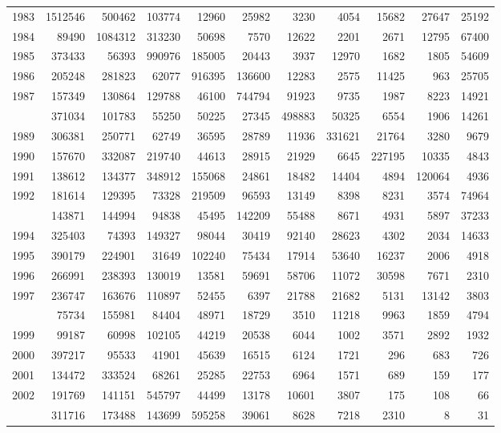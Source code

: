 \documentclass[
]{article}
\begin{document}
\begin{longtable}[t]{lrrrrrrrrrr}
1983 & 1512546 & 500462 & 103774 & 12960 & 25982 & 3230 & 4054 & 15682 & 27647 & 25192\\
1984 & 89490 & 1084312 & 313230 & 50698 & 7570 & 12622 & 2201 & 2671 & 12795 & 67400\\
1985 & 373433 & 56393 & 990976 & 185005 & 20443 & 3937 & 12970 & 1682 & 1805 & 54609\\
1986 & 205248 & 281823 & 62077 & 916395 & 136600 & 12283 & 2575 & 11425 & 963 & 25705\\
1987 & 157349 & 130864 & 129788 & 46100 & 744794 & 91923 & 9735 & 1987 & 8223 & 14921\\
\addlinespace
1988 & 371034 & 101783 & 55250 & 50225 & 27345 & 498883 & 50325 & 6554 & 1906 & 14261\\
1989 & 306381 & 250771 & 62749 & 36595 & 28789 & 11936 & 331621 & 21764 & 3280 & 9679\\
1990 & 157670 & 332087 & 219740 & 44613 & 28915 & 21929 & 6645 & 227195 & 10335 & 4843\\
1991 & 138612 & 134377 & 348912 & 155068 & 24861 & 18482 & 14404 & 4894 & 120064 & 4936\\
1992 & 181614 & 129395 & 73328 & 219509 & 96593 & 13149 & 8398 & 8231 & 3574 & 74964\\
\addlinespace
1993 & 143871 & 144994 & 94838 & 45495 & 142209 & 55488 & 8671 & 4931 & 5897 & 37233\\
1994 & 325403 & 74393 & 149327 & 98044 & 30419 & 92140 & 28623 & 4302 & 2034 & 14633\\
1995 & 390179 & 224901 & 31649 & 102240 & 75434 & 17914 & 53640 & 16237 & 2006 & 4918\\
1996 & 266991 & 238393 & 130019 & 13581 & 59691 & 58706 & 11072 & 30598 & 7671 & 2310\\
1997 & 236747 & 163676 & 110897 & 52455 & 6397 & 21788 & 21682 & 5131 & 13142 & 3803\\
\addlinespace
1998 & 75734 & 155981 & 84404 & 48971 & 18729 & 3510 & 11218 & 9963 & 1859 & 4794\\
1999 & 99187 & 60998 & 102105 & 44219 & 20538 & 6044 & 1002 & 3571 & 2892 & 1932\\
2000 & 397217 & 95533 & 41901 & 45639 & 16515 & 6124 & 1721 & 296 & 683 & 726\\
2001 & 134472 & 333524 & 68261 & 25285 & 22753 & 6964 & 1571 & 689 & 159 & 177\\
2002 & 191769 & 141151 & 545797 & 44499 & 13178 & 10601 & 3807 & 175 & 108 & 66\\
\addlinespace
2003 & 311716 & 173488 & 143699 & 595258 & 39061 & 8628 & 7218 & 2310 & 8 & 31\\

\end{longtable}
\end{document}
